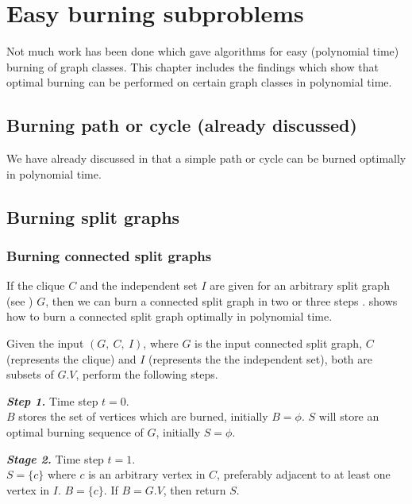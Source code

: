 \chapter{Easy burning subproblems}\label{chapter:where-easy}

Not much work has been done which gave algorithms for easy (polynomial time) burning of graph classes. This chapter includes the findings which show that optimal burning can be performed on certain graph classes in polynomial time.

\section{Burning path or cycle (already discussed)}

We have already discussed in  that a simple path or cycle can be burned optimally in polynomial time.

\section{Burning split graphs}

\subsection{Burning connected split graphs}

If the clique $C$ and the independent set $I$ are given for an arbitrary split graph (see ) $G$, then we can burn a connected split graph in two or three steps \cite{Kare2019}.  shows how to burn a connected split graph optimally in polynomial time.

\begin{algorithm}\label{algorithm:burn-connected-split-graphs}
Given the input $(G,\ C,\ I)$, where $G$ is the input connected split graph, $C$ (represents the clique) and $I$ (represents the the independent set), both are subsets of $G.V$, perform the following steps.
\end{algorithm}

\textbf{\textit{Step 1.}} Time step $t=0$.\\
$B$ stores the set of vertices which are burned, initially $B=\phi$. $S$ will store an optimal burning sequence of $G$, initially $S=\phi$.

\textbf{\textit{Stage 2.}} Time step $t=1$.\\
$S=\{c\}$ where $c$ is an arbitrary vertex in $C$, preferably adjacent to at least one vertex in $I$. $B=\{c\}$. If $B=G.V$, then return $S$.

